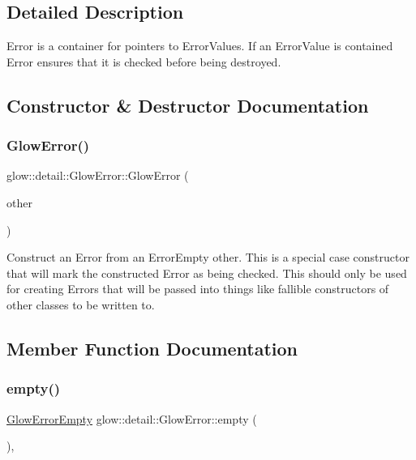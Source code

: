 \subsection{Detailed Description}
Error is a container for pointers to Error\+Values. If an Error\+Value is contained Error ensures that it is checked before being destroyed. 

\subsection{Constructor \& Destructor Documentation}
\mbox{\label{classglow_1_1detail_1_1_glow_error_aea26d7c94e341820fae4ad2bf0c1babc}} 
\subsubsection{\texorpdfstring{Glow\+Error()}{GlowError()}}
{\footnotesize\ttfamily glow\+::detail\+::\+Glow\+Error\+::\+Glow\+Error (\begin{DoxyParamCaption}\item[{\hyperlink{classglow_1_1detail_1_1_glow_error_empty}{Glow\+Error\+Empty} \&\&}]{other }\end{DoxyParamCaption})}

Construct an Error from an Error\+Empty {\ttfamily other}. This is a special case constructor that will mark the constructed Error as being checked. This should only be used for creating Errors that will be passed into things like fallible constructors of other classes to be written to. 

\subsection{Member Function Documentation}
\mbox{\label{classglow_1_1detail_1_1_glow_error_afcbda87e6414c7502d8c0b9b8a348efa}} 
\subsubsection{\texorpdfstring{empty()}{empty()}}
{\footnotesize\ttfamily \hyperlink{classglow_1_1detail_1_1_glow_error_empty}{Glow\+Error\+Empty} glow\+::detail\+::\+Glow\+Error\+::empty (\begin{DoxyParamCaption}{ }\end{DoxyParamCaption})\hspace{0.3cm}{\ttfamily [inline]}, {\ttfamily [static]}}




